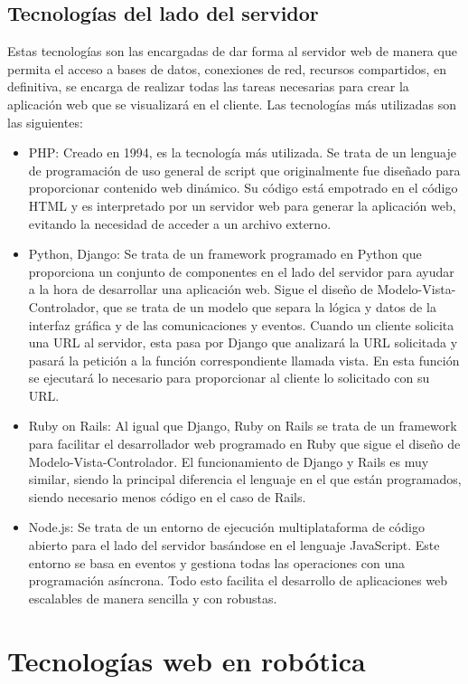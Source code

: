 \subsection{Tecnologías del lado del servidor}
Estas tecnologías son las encargadas de dar forma al servidor web de manera que permita el acceso a bases de datos, conexiones de red, recursos compartidos, en definitiva, se encarga de realizar todas las tareas necesarias para crear la aplicación web que se visualizará en el cliente. Las tecnologías más utilizadas son las siguientes:
\begin{itemize}
	\item PHP: Creado en 1994, es la tecnología más utilizada. Se trata de un lenguaje de programación de uso general de script que originalmente fue diseñado para proporcionar contenido web dinámico. Su código está empotrado en el código HTML y es interpretado por un servidor web para generar la aplicación web, evitando la necesidad de acceder a un archivo externo.
	\item Python, Django: Se trata de un framework programado en Python que proporciona un conjunto de componentes en el lado del servidor para ayudar a la hora de desarrollar una aplicación web. Sigue el diseño de Modelo-Vista-Controlador, que se trata de un modelo que separa la lógica y datos de la interfaz gráfica y de las comunicaciones y eventos. Cuando un cliente solicita una URL al servidor, esta pasa por Django que analizará la URL solicitada y pasará la petición a la función correspondiente llamada vista. En esta función se ejecutará lo necesario para proporcionar al cliente lo solicitado con su URL.
	\item Ruby on Rails: Al igual que Django, Ruby on Rails se trata de un framework para facilitar el desarrollador web programado en Ruby que sigue el diseño de Modelo-Vista-Controlador. El funcionamiento de Django y Rails es muy similar, siendo la principal diferencia el lenguaje en el que están programados, siendo necesario menos código en el caso de Rails.
	\item Node.js: Se trata de un entorno de ejecución multiplataforma de código abierto para el lado del servidor basándose en el lenguaje JavaScript. Este entorno se basa en eventos y gestiona todas las operaciones con una programación asíncrona. Todo esto facilita el desarrollo de aplicaciones web escalables de manera sencilla y con robustas.
\end{itemize}

\section{Tecnologías web en robótica}

